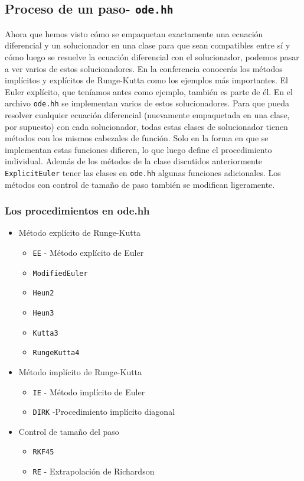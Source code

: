 \subsection{Proceso de un paso- \lstinline{ode.hh}}

Ahora que hemos visto cómo se empaquetan exactamente una ecuación diferencial y un solucionador en una clase
para que sean compatibles entre sí y cómo luego se resuelve la ecuación diferencial con el solucionador, podemos pasar a ver varios de estos solucionadores. En la conferencia conocerás los métodos implícitos y explícitos de Runge-Kutta como los ejemplos más importantes. El Euler explícito, que teníamos antes como ejemplo, también es parte de él. En el archivo \lstinline{ode.hh}
se implementan varios de estos solucionadores. Para que pueda resolver cualquier ecuación diferencial (nuevamente empaquetada en una clase, por supuesto) con cada solucionador, todas estas clases de solucionador tienen métodos con los mismos cabezales de función. Solo en la forma en que se implementan estas funciones difieren, lo que luego define el procedimiento individual. Además de los métodos de la clase discutidos anteriormente \lstinline{ExplicitEuler} tener las clases en
\lstinline{ode.hh} algunas funciones adicionales. Los métodos con control de tamaño de paso también se modifican ligeramente.


\subsubsection{Los procedimientos en ode.hh}
\begin{itemize}
\item Método explícito de Runge-Kutta 
  \begin{itemize}
  \item\lstinline{EE} - Método explícito de Euler
  \item\lstinline{ModifiedEuler}
  \item\lstinline{Heun2}
  \item\lstinline{Heun3}
  \item\lstinline{Kutta3}
  \item\lstinline{RungeKutta4}
  \end{itemize}
\item Método implícito de Runge-Kutta 
  \begin{itemize}
  \item \lstinline{IE} - Método implícito de Euler
  \item \lstinline{DIRK} -Procedimiento implícito diagonal
  \end{itemize}
\item Control de tamaño del paso
  \begin{itemize}
  \item\lstinline{RKF45}
  \item\lstinline{RE} - Extrapolación de Richardson
  \end{itemize}
\end{itemize}

